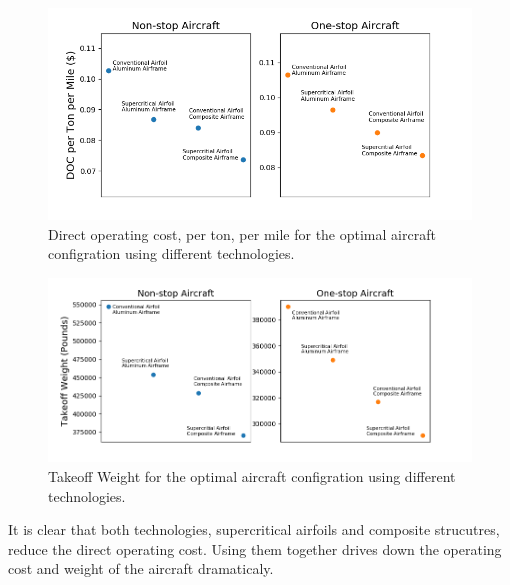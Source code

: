 \documentclass{article}
\begin{document}
\begin{flushleft}
            \begin{figure}[ht]
                \centering
                \includegraphics[scale=0.7]{tech.PNG}
                \caption{Direct operating cost, per ton, per mile for the optimal aircraft configration using different technologies.}
                \label{fig:doc}
            \end{figure}

            \begin{figure}[ht]
                \centering
                \includegraphics[scale=0.7]{tech_weight.PNG}
                \caption{Takeoff Weight for the optimal aircraft configration using different technologies.}
                \label{fig:weight}
            \end{figure}

            It is clear that both technologies, supercritical airfoils and
            composite strucutres, reduce the direct operating cost. Using them
            together drives down the operating cost and weight of the aircraft
            dramaticaly.

        \end{flushleft}
\end{document}
